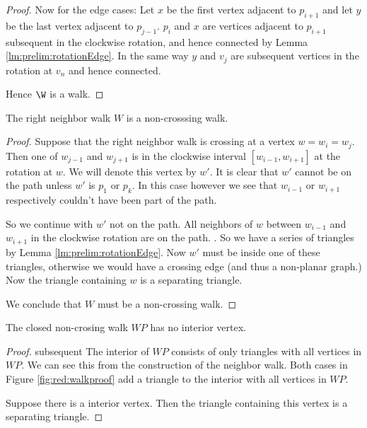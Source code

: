 \begin{proof}
    Now for the edge cases: Let $x$ be the first vertex adjacent to $p_{i+1}$ and let $y$ be the last vertex adjacent to $p_{j-1}$. $p_i$ and $x$ are vertices adjacent to $p_{i+1}$ subsequent in the clockwise rotation, and hence connected by Lemma \ref{lm:prelim:rotationEdge}. In the same way $y$ and $v_j$ are subsequent vertices in the rotation at $v_n$ and hence connected.

    Hence $\W$ is a walk.
  \end{proof}


  \begin{lemma}
    \label{lm:red:neighborWalkNoncrossing}
    The right neighbor walk $W$ is a non-crosssing walk.
  \end{lemma}
  \begin{proof}
    Suppose that the right neighbor walk is crossing at a vertex $w= w_i =w_j$. Then one of $w_{j-1}$ and $w_{j+1}$ is in the clockwise interval $[w_{i-1}, w_{i+1} ]$ at the rotation at $w$. We will denote this vertex by $w'$. It is clear that $w'$ cannot be on the path unless $w'$ is $p_1$ or $p_k$. In this case however we see that $w_{i-1}$ or $w_{i+1}$ respectively couldn't have been part of the path.

    So we continue with $w'$ not on the path. All neighbors of $w$ between $w_{i-1}$ and $w_{i+1}$ in the clockwise rotation are on the path. . So we have a series of triangles by Lemma \ref{lm:prelim:rotationEdge}. Now $w'$ must be inside one of these triangles, otherwise we would have a crossing edge (and thus a non-planar graph.) Now the triangle containing $w$ is a separating triangle.

    We conclude that $W$ must be a non-crossing walk.
  \end{proof}


  \begin{lemma}
    \label{lm:red:neighbourwalkNoInteriorVertex}
    The closed non-crosing walk $WP$ has no interior vertex.
  \end{lemma}
  \begin{proof}subsequent
    The interior of $WP$ consists of only triangles with all vertices in $WP$. We can see this from the construction of the neighbor walk. Both cases in Figure \ref{fig:red:walkproof} add a triangle to the interior with all vertices in $WP$.

    Suppose there is a interior vertex. Then the triangle containing this vertex is a separating triangle.
  \end{proof}



